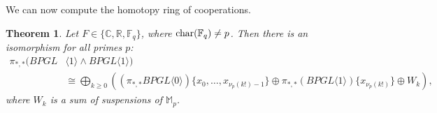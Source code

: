 \documentclass{amsart}
\newtheorem{theorem}{Theorem}[section]
\theoremstyle{plain}
\numberwithin{theorem}{section}
\numberwithin{equation}{section}
\numberwithin{figure}{section}
\newcommand{\0}{\langle 0 \rangle }
\begin{document}
We can now compute the homotopy ring of cooperations.
\begin{theorem}
\label{thm:BPGL1homotopyCooperations}
    Let $F \in \{\mathbb{C}, \mathbb{R}, \mathbb{F}_q\}$, where $\textup{char}(\mathbb{F}_q) \neq p$. Then there is an isomorphism for all primes $p$:
    \begin{align*}
        \pi_{*,*}(BPGL & \langle 1 \rangle \wedge  BPGL \langle 1 \rangle) \\
        & \cong \underset{k \geq 0}{\bigoplus} \left((\pi_{*,*}BPGL \langle 0 \rangle)\{x_0, \dots, x_{\nu_p(k!)-1}\}
    \oplus \pi_{*,*}(BPGL \langle 1 \rangle) \{x_{\nu_p(k!)}\} \oplus W_k \right),
    \end{align*}
    where $W_k$ is a sum of suspensions of $\mathbb{M}_p$.
\end{theorem}
\end{document}
